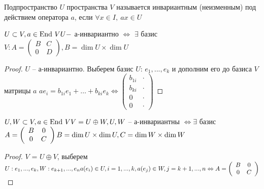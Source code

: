 \begin{Def}
	Подпространство $U$ пространства $V$ называется инвариантным (неизменным) под действием оператора $a$, если 
	$\forall x \in I, \ ax \in U$
\end{Def}

\begin{Lm}
	$U \subset V, a \in \operatorname{End} \, V\\
	U -$ а-инвариантно $\Leftrightarrow$ $\exists$ базис $V: A = 
	\left(\begin{array}{cc}
		B & C\\
		0 & D
		\end{array}\right), B = \dim U \times \dim U$
\end{Lm}

\begin{proof}
	$U$ -- а-инвариантно. Выберем базис $U$: $e_1, ... , e_k$ и дополним его до базиса $V$ матрицы $a$
	$ae_i = b_{1i}e_1+\dots+b_{ki}e_k \Leftrightarrow \left(\begin{array}{cc}
		b_{1i} & \cdot\\
		b_{ki} & \cdot\\
		0 & \cdot \\
		0 & \cdot
	\end{array}
	\right)$
\end{proof}

\begin{Lm}
	$U, W \subset V, a \in \operatorname{End} \, V\\
	V = U \oplus W, U, W$ -- а-инвариантны $\Leftrightarrow \exists$ базис $A = \left(\begin{array}{cc}
		B & 0\\
		0 & C
	\end{array}\right)\\
	B = \dim U \times \dim U, C = \dim W \times \dim W$
\end{Lm}

\begin{proof}
	$V$ = $U \oplus V$, выберем $U: e_1, ..., e_k, W: e_{k+1}, ..., e_n\\
	a(e_i) \in U, i = 1, ..., k, a(e_j) \in W, j = k+1, ..., n \Leftrightarrow A = \left(\begin{array}{cc}
		B & 0\\
		0 & C
	\end{array}\right)$
\end{proof}

